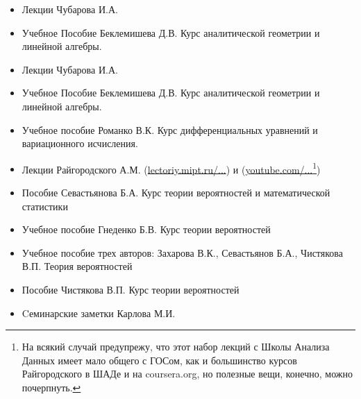 \begin{itemize}[wide,  labelwidth=!, noitemsep, label=$\blacktriangleright$, labelindent = 0pt]
\item
Лекции Чубарова И.А. 
\item
Учебное Пособие Беклемишева Д.В. \glqq Курс аналитической геометрии и линейной алгебры\grqq.
\end{itemize}

\begin{itemize}[wide,  labelwidth=!, noitemsep, label=$\blacktriangleright$, labelindent = 0pt]
\item
Лекции Чубарова И.А. 
\item
Учебное Пособие Беклемишева Д.В. \glqq Курс аналитической геометрии и линейной алгебры\grqq.
\end{itemize}

\begin{itemize}[wide,  labelwidth=!, noitemsep, label=$\blacktriangleright$, labelindent = 0pt]
\item
Учебное пособие Романко В.К. \glqq Курс дифференциальных уравнений и вариационного исчисления\grqq.
\end{itemize}

\begin{itemize}[wide,  labelwidth=!, noitemsep, label=$\blacktriangleright$, labelindent = 0pt]
\item
Лекции Райгородского А.М. (\href{http://lectoriy.mipt.ru/course/Maths-ProbabilityTheoryBasics-L15}{lectoriy.mipt.ru/...}) и (\href{https://www.youtube.com/playlist?list=PLJOzdkh8T5kouOIbZDCqzB72hBn9T7gsJ}{youtube.com/...\footnote{На всякий случай предупрежу, что этот набор лекций с Школы Анализа Данных имеет мало общего с ГОСом, как и большинство курсов Райгородского в ШАДе и на \href{https://www.coursera.org}{coursera.org}, но полезные вещи, конечно, можно почерпнуть.}})
\item
Пособие Севастьянова Б.А. \glqq Курс теории вероятностей и математической статистики\grqq
\item
Учебное пособие Гнеденко Б.В. \glqq Курс теории вероятностей\grqq
\item 
Учебное пособие трех авторов: Захарова В.К., Севастьянов Б.А., Чистякова В.П. \glqq Теория вероятностей\grqq
\item
Пособие Чистякова В.П. \glqq Курс теории вероятностей\grqq
\item
Cеминарские заметки Карлова М.И.
\end{itemize}

